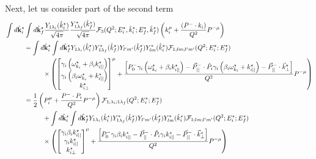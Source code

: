 Next, let us consider part of the second term
\begin{align}
&\int d\hat{\bf k}^\star_i\int d\hat{\bf k}^\star_f
\frac{Y_{1\lambda_i}(\hat{k}_i^\star)}{\sqrt{4\pi}}
\frac{Y^*_{1\lambda_f}(\hat{k}_f^\star)}{\sqrt{4\pi}}\mathcal{F}_{3}(Q^2;E_i^\star,\hat{k}^\star_i;E_f^\star,\hat{k}^\star_f)
\left(k^{\mu}_i+\frac{(P^-\cdot k_i)}{Q^2} P^{-\mu}\right)\nn\\
&\hspace{1cm}=
\int d\hat{\bf k}^\star_i\int d\hat{\bf k}^\star_f
{Y_{1\lambda_i}(\hat{k}_i^\star)}
{Y^*_{1\lambda_f}(\hat{k}_f^\star)}
Y_{l^\prime m^\prime}(\hat{k}_f^\star)  
Y^*_{lm}(\hat{k}_i^\star)
 \mathcal{F}_{1;l m;l^\prime m^\prime}(Q^2;E_i^\star;E_f^\star)
\nn\\
&\hspace{2cm}\times
\left(
\begin{bmatrix} 
\gamma_i\left(\omega_{k_i}^\star+\beta_ik_{i||}^\star\right)\\
\gamma_i\left(\beta_i\omega_{k_i}^\star+k_{i||}^\star\right)\\
 k^\star_{i\perp}
 \end{bmatrix}^\mu
+
\frac{\left[P^-_0\gamma_i\left(\omega_{k_i}^\star+\beta_ik_{i||}^\star\right)-\vec{P}^-_{||}\cdot\hat{P}_i \gamma_i\left(\beta_i\omega_{k_i}^\star+k_{i||}^\star\right) - \vec{P}^-_{||}\cdot\vec{k}^\star_\perp\right]}{Q^2} P^{-\mu}\right)
\nn\\
&\hspace{1cm}=
\frac{1}{2}\left(
P^\mu_i
+
\frac{P^-\cdot P_i}{Q^2} P^{-\mu}\right)
\mathcal{F}_{1;\lambda_i;1 \lambda_f}(Q^2;E_i^\star;E_f^\star)
\nn\\
&\hspace{2cm}+\int d\hat{\bf k}^\star_i\int d\hat{\bf k}^\star_f
{Y_{1\lambda_i}(\hat{k}_i^\star)}
{Y^*_{1\lambda_f}(\hat{k}_f^\star)}
Y_{l^\prime m^\prime}(\hat{k}_f^\star)  
Y^*_{lm}(\hat{k}_i^\star)
 \mathcal{F}_{1;l m;l^\prime m^\prime}(Q^2;E_i^\star;E_f^\star)
\nn\\
&\hspace{2cm}\times
\left(
\begin{bmatrix} 
\gamma_i\beta_ik_{i||}^\star\\
\gamma_i k_{i||}^\star\\
 k^\star_{i\perp}
 \end{bmatrix}^\mu
+
\frac{\left[P^-_0\gamma_i \beta_ik_{i||}^\star-\vec{P}^-_{||}\cdot\hat{P}_i \gamma_i k_{i||}^\star - \vec{P}^-_{||}\cdot\vec{k}^\star_\perp\right]}{Q^2} P^{-\mu}\right)

\end{align}
